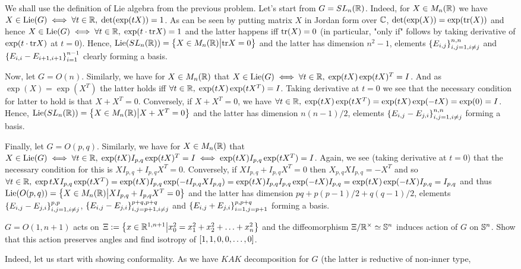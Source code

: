 \documentclass[8pt]{article} %
\newcommand{\Lie}{\mbox{\normalfont{Lie}}}
\newcommand{\tr}{\mbox{\normalfont{tr}}}
\newcommand{\myprobshort}[2]{\begin{myprob}[#1]#2\end{myprob}}
\begin{document}
We shall use the definition of Lie algebra from the previous problem. Let's start from $G=SL_n(\mathbb{R})$. Indeed, for
$X\in M_n(\mathbb{R})$ we have $X\in\Lie(G)\iff\forall t\in\R ,\;\det(\exp(tX))=1$. As can be seen by
putting matrix $X$ in Jordan form over $\mathbb{C}$, $\det(\exp(X))=\exp(\tr(X))$ and hence $X\in\Lie(G)\iff\forall t\in\R,\;\exp(t\cdot
\tr X)=1$ and the latter happens iff $\tr(X)=0$ (in particular, "only if" follows by taking derivative of $\exp(t\cdot\tr X)$ at
$t=0$). Hence, $\Lie(SL_n(\R))=\mysetn{X\in M_n(\R)}{\tr X=0}$ and the latter has dimension $n^2-1$, elements $\left\{ E_{i,j} \right\}_{
i,j=1,i\neq j}^{n,n}$ and $\left\{E_{ i,i }-E_{ i+1,i+1 } \right\}_{i=1 }^{n-1}$ clearly forming a basis.\par
Now, let $G=O(n)$. Similarly, we have for $X\in M_n(\mathbb{R})$ that $X\in\Lie(G)\iff \forall t\in\R,\;\exp(tX)\exp(tX)^T=I$. And
as $\exp(X)=\exp(X^T)$ the latter holds iff $\forall  t\in\mathbb{R},\;\exp(tX)\exp(tX^T)=I$. Taking derivative at $t=0$ we see
that the necessary condition for latter to hold is that $X+X^T=0$. Conversely, if $X+X^T=0$, we have $\forall t\in\mathbb{R},\;
\exp(tX)\exp(tX^T)=\exp(tX)\exp(-tX)=\exp(0)=I$. Hence, 
$\Lie(SL_n(\R))=\mysetn{X\in M_n(\R)}{X+X^T=0}$ and
the latter has dimension $n(n-1)/2$, elements $\left\{ E_{ i,j }-E_{ j,i } \right\}_{ i,j=1,i\neq j }^{ n,n }$ forming a basis.\par
Finally, let $G=O(p,q)$. Similarly, we have for $X\in M_n(\mathbb{R})$ that $X\in\Lie(G)\iff \forall t\in\R,\;\exp(tX)I_{ p,q }
\exp(tX)^T=I\iff\exp(tX)I_{ p,q }\exp(tX^T)=I$. Again, we see (taking derivative at $t=0$) that the necessary condition for this is
$XI_{ p,q }+I_{ p,q }X^T=0$. Conversely, if $XI_{ p,q }+I_{ p,q }X^T=0$ then $X_{ p,q }XI_{ p,q }=-X^T$ and so
$\forall t\in\mathbb{R},\;\exp{ tX }I_{ p,q }\exp(tX^T)=
\exp(tX)I_{ p,q }\exp(-tI_{ p,q }XI_{ p,q })=\exp(tX)I_{ p,q }I_{ p,q }\exp(-tX)I_{ p,q }=\exp(tX)\exp(-tX)I_{ p,q }=I_{ p,q }$
and thus 
$\Lie(O(p,q))=\mysetn{X\in M_n(\R)}{XI_{ p,q }+I_{ p,q }X^T=0}$ and
the latter has dimension $pq+p(p-1)/2+q(q-1)/2$, elements 
$\left\{ E_{ i,j }-E_{ j,i } \right\}_{ i,j=1,i\neq j }^{ p,p }$,  
$\left\{ E_{ i,j }-E_{ j,i } \right\}_{ i,j=p+1,i\neq j }^{ p+q,p+q }$ and
$\left\{ E_{ i,j }+E_{ j,i } \right\}_{ i=1,j=p+1 }^{ p,p+q }$
forming a basis.
\myprobshort{ April 14, Example 2.3.2 }{ $G=O(1,n+1)$ acts on $\Xi:=\left\{ x\in\mathbb{R}^{ 1,n+1 } \big|  x_0^2=x_1^2+x_2^2+\hdots+x_n^2 \right\}$
and the diffeomorphism $\Xi/\mathbb{R}^{ \times }\simeq \mathbb{S}^{n}$ induces action of $G$ on $\mathbb{S}^{ n }$. Show that this action
preserves angles and find isotropy of $\left[ 1,1,0,0,\hdots,0 \right]$.}
Indeed, let us start with showing conformality. As we have $KAK$ decomposition for $G$ (the latter is reductive of non-inner type,
\end{document}
